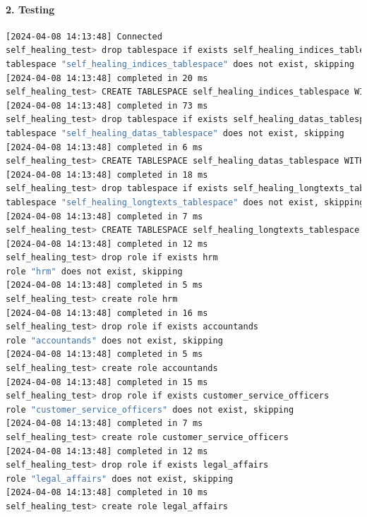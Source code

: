 \begin{flushleft}
\paragraph{2. Testing}
\lstset{style=gra_codestyle}
\begin{lstlisting}[language=bash, caption=yugabyteDB - Evaluation-Testing,captionpos=b,label={lst:yugabytedb-evaluation-testing},breaklines=true]
[2024-04-08 14:13:48] Connected
self_healing_test> drop tablespace if exists self_healing_indices_tablespace
tablespace "self_healing_indices_tablespace" does not exist, skipping
[2024-04-08 14:13:48] completed in 20 ms
self_healing_test> CREATE TABLESPACE self_healing_indices_tablespace WITH (replica_placement='{"num_replicas": 3, "placement_blocks": [ {"cloud":"cloud1","region":"datacenter1","zone":"rack1","min_num_replicas":3}]}')
[2024-04-08 14:13:48] completed in 73 ms
self_healing_test> drop tablespace if exists self_healing_datas_tablespace
tablespace "self_healing_datas_tablespace" does not exist, skipping
[2024-04-08 14:13:48] completed in 6 ms
self_healing_test> CREATE TABLESPACE self_healing_datas_tablespace WITH (replica_placement='{"num_replicas": 3, "placement_blocks": [ {"cloud":"cloud1","region":"datacenter1","zone":"rack1","min_num_replicas":3}]}')
[2024-04-08 14:13:48] completed in 18 ms
self_healing_test> drop tablespace if exists self_healing_longtexts_tablespace
tablespace "self_healing_longtexts_tablespace" does not exist, skipping
[2024-04-08 14:13:48] completed in 7 ms
self_healing_test> CREATE TABLESPACE self_healing_longtexts_tablespace WITH (replica_placement='{"num_replicas": 3, "placement_blocks": [ {"cloud":"cloud1","region":"datacenter1","zone":"rack1","min_num_replicas":3}]}')
[2024-04-08 14:13:48] completed in 12 ms
self_healing_test> drop role if exists hrm
role "hrm" does not exist, skipping
[2024-04-08 14:13:48] completed in 5 ms
self_healing_test> create role hrm
[2024-04-08 14:13:48] completed in 16 ms
self_healing_test> drop role if exists accountands
role "accountands" does not exist, skipping
[2024-04-08 14:13:48] completed in 5 ms
self_healing_test> create role accountands
[2024-04-08 14:13:48] completed in 15 ms
self_healing_test> drop role if exists customer_service_officers
role "customer_service_officers" does not exist, skipping
[2024-04-08 14:13:48] completed in 7 ms
self_healing_test> create role customer_service_officers
[2024-04-08 14:13:48] completed in 12 ms
self_healing_test> drop role if exists legal_affairs
role "legal_affairs" does not exist, skipping
[2024-04-08 14:13:48] completed in 10 ms
self_healing_test> create role legal_affairs

\end{lstlisting}
\end{flushleft}
